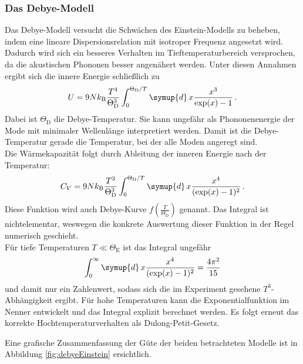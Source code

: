 \subsubsection{Das Debye-Modell}
Das Debye-Modell versucht die Schwächen des Einstein-Modells zu beheben, indem eine lineare Dispersionsrelation mit isotroper Frequenz angesetzt wird. Dadurch wird sich ein besseres Verhalten im Tieftemperaturbereich versprochen, da die akustischen Phononen besser angenähert werden.
Unter diesen Annahmen ergibt sich die innere Energie schließlich zu
\begin{equation}
  U = 9 N k_\text{B} \frac{T^4}{\Theta_\text{D}^3}\int_0^{\Theta_\text{D}/T} \symup{d}\,x \frac{x^3}{\exp(x)-1}\,.
  \label{eqn:uDebye}
\end{equation}
Dabei ist $\Theta_\text{D}$ die Debye-Temperatur. Sie kann ungefähr als Phononenenergie der Mode mit minimaler Wellenlänge interpretiert werden. Damit ist die Debye-Temperatur gerade die Temperatur, bei der alle Moden angeregt sind.\\
Die Wärmekapazität folgt durch Ableitung der inneren Energie nach der Temperatur:
\begin{equation}
  C_V = 9 N k_\text{B} \frac{T^3}{\Theta_\text{D}^3}\int_0^{\Theta_\text{D}/T} \symup{d}\,x \frac{x^4}{(\exp(x)-1)^2}\,.
  \label{eqn:cVDebye}
\end{equation}
Diese Funktion wird auch Debye-Kurve $f\left(\frac{T}{\Theta_\text{D}}\right)$ genannt.
Das Integral ist nichtelementar, weswegen die konkrete Auswertung dieser Funktion in der Regel numerisch geschieht. \\
Für tiefe Temperaturen $T \ll \Theta_\text{E}$ ist das Integral ungefähr
\begin{equation}
  \int_0^{\infty} \symup{d}\,x \frac{x^4}{(\exp(x)-1)^2} = \frac{4\pi^2}{15}
  \label{eqn:theorieIntegral}
\end{equation}
und damit nur ein Zahlenwert, sodass sich die im Experiment gesehene $T^3$-Abhängigkeit ergibt. Für hohe Temperaturen kann die Exponentialfunktion im Nenner entwickelt und das Integral explizit berechnet werden. Es folgt erneut das korrekte Hochtemperaturverhalten als Dulong-Petit-Gesetz.

Eine grafische Zusammenfassung der Güte der beiden betrachteten Modelle ist in Abbildung \ref{fig:debyeEinstein} ersichtlich.

